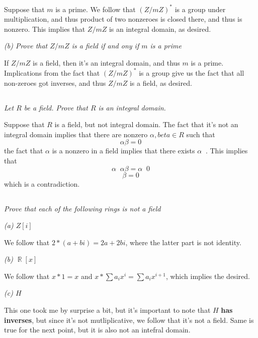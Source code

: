 \documentclass[11pt,oneside,titlepage]{book}
\DeclareMathOperator \real {\mathbb {R}}
\DeclareMathOperator \inv {^{-1}}
\begin{document}
Suppose that $m$ is a prime. We follow that $(Z/mZ)^*$ is a group
under multiplication, and thus product of two nonzeroes is closed
there, and thus is nonzero. This implies that $Z/mZ$ is an integral
domain, as desired.

\textit{(b) Prove that $Z/mZ$ is a field if and ony if $m$
  is a prime}

If $Z/mZ$ is a field, then it's an integral domain, and thus $m$ is a prime.
Implications from the fact that $(Z/mZ)^*$ is a group give us the fact that
all non-zeroes got inverses, and thus $Z/mZ$ is a field, as desired.

\subsection{}

\textit{Let $R$ be a field. Prove that $R$ is an integral domain.}

Suppose that $R$ is a field, but not integral domain. The fact that
it's not an integral domain implies that there are nonzero
$\alpha, beta \in R$ such that 
$$\alpha \beta = 0$$
the fact that $\alpha$ is a nonzero in a field implies that there exists $\alpha \inv$.
This implies that
$$\alpha \inv \alpha \beta = \alpha \inv 0 $$
$$ \beta =  0 $$
which is a contradiction.

\subsection{}

\textit{Prove that each of the following rings is not a field}

\textit{(a) $Z[i]$}

We follow that $2 * (a + bi) = 2a + 2bi$, where the latter part is not identity.

\textit{(b) $\real[x]$}

We follow that $x * 1 = x$ and $x * \sum{a_i x^i} = \sum{a_i x^{i +
    1}}$, which implies the desired.

\textit{(c) $H$}

This one took me by surprise a bit, but it's important to note that
$H$ \textbf{has inverses}, but since it's not mutliplicative, we
follow that it's not a field. Same is true for the next point, but it
is also not an intefral domain.

\subsection{}
\end{document}
